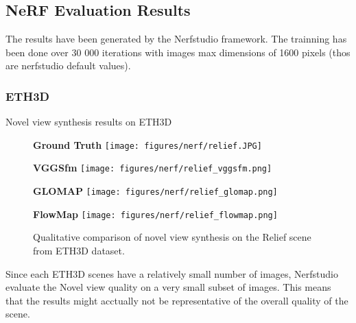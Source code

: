 \newpage
\subsection{NeRF Evaluation Results}\label{sec:nerf-evaluation-results}

The results have been generated by the Nerfstudio framework. 
The trainning has been done over 30 000 iterations with images max dimensions of 1600 pixels (thos are nerfstudio default values).

\subsubsection{ETH3D}\label{sec:nerf-evaluation-results-eth3d}
Novel view synthesis results on ETH3D



\begin{figure}
    \begin{minipage}[h]{0.23\textwidth}
        \centering
        \textbf{Ground Truth}
        \texttt{[image: figures/nerf/relief.JPG]}
    \end{minipage}
    \hspace{0.001\textwidth}
    \begin{minipage}[h]{0.23\textwidth}
        \centering
        \textbf{VGGSfm}
        \texttt{[image: figures/nerf/relief\_vggsfm.png]}
    \end{minipage}
    \hspace{0.001\textwidth}
    \begin{minipage}[h]{0.23\textwidth}
        \centering
        \textbf{GLOMAP}
        \texttt{[image: figures/nerf/relief\_glomap.png]}
    \end{minipage}
    \hspace{0.001\textwidth}
    \begin{minipage}[h]{0.23\textwidth}
        \centering
        \textbf{FlowMap}
        \texttt{[image: figures/nerf/relief\_flowmap.png]}
    \end{minipage}
    \caption{Qualitative comparison of novel view synthesis on the Relief scene from ETH3D dataset.}
\end{figure}

Since each ETH3D scenes have a relatively small number of images, Nerfstudio evaluate the Novel view quality on a very small subset of images.
This means that the results might acctually not be representative of the overall quality of the scene.

